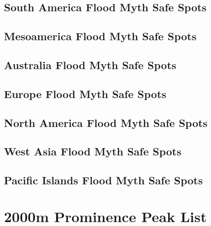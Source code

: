 \documentclass[10pt,twocolumn,letterpaper]{article}
\begin{document}
\subsection{South America Flood Myth Safe Spots}

\subsection{Mesoamerica Flood Myth Safe Spots}

\subsection{Australia Flood Myth Safe Spots}

\subsection{Europe Flood Myth Safe Spots}

\subsection{North America Flood Myth Safe Spots}

\subsection{West Asia Flood Myth Safe Spots}

\subsection{Pacific Islands Flood Myth Safe Spots}

\clearpage
\twocolumn

\section{2000m Prominence Peak List}

\end{document}

